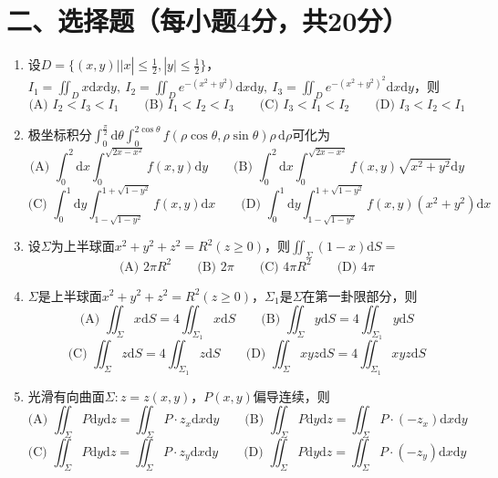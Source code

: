 \documentclass[12pt,a4paper]{ctexart}
\begin{document}
\section*{二、选择题（每小题4分，共20分）}
\begin{enumerate}
\item 设$D=\{(x,y)||x|\le \frac{1}{2},|y|\le\frac{1}{2}\}$，$I_{1}=\iint_{D} x \mathrm{d}x\mathrm{d}y,\ I_{2}=\iint_{D} e^{-(x^2+y^2)}\mathrm{d}x\mathrm{d}y,\ I_{3}=\iint_{D} e^{-(x^2+y^2)^2}\mathrm{d}x\mathrm{d}y$，则
\[
\text{(A) } I_{2}<I_{3}<I_{1}\qquad \text{(B) } I_{1}<I_{2}<I_{3}\qquad \text{(C) } I_{3}<I_{1}<I_{2}\qquad \text{(D) } I_{3}<I_{2}<I_{1}
\]

\item 极坐标积分$\int_{0}^{\frac{\pi}{2}} \mathrm{d}\theta \int_{0}^{2 \cos \theta} f(\rho \cos \theta,\rho \sin \theta)\rho \,\mathrm{d}\rho$可化为
\[
\text{(A) } \int_{0}^{2} \mathrm{d}x \int_{0}^{\sqrt{2x-x^{2}}} f(x,y)\mathrm{d}y\qquad 
\text{(B) } \int_{0}^{2} \mathrm{d}x \int_{0}^{\sqrt{2x-x^{2}}} f(x,y)\sqrt{x^2+y^2}\mathrm{d}y
\]
\[
\text{(C) } \int_{0}^{1} \mathrm{d}y \int_{1-\sqrt{1-y^{2}}}^{1+\sqrt{1-y^{2}}} f(x,y)\mathrm{d}x\qquad 
\text{(D) } \int_{0}^{1} \mathrm{d}y \int_{1-\sqrt{1-y^{2}}}^{1+\sqrt{1-y^{2}}} f(x,y)(x^2+y^2)\mathrm{d}x
\]

\item 设$\Sigma$为上半球面$x^{2}+y^{2}+z^{2}=R^{2}(z \ge 0)$，则$\iint_{\Sigma }(1-x)\mathrm{d}S=$
\[
\text{(A) } 2 \pi R^{2}\qquad \text{(B) } 2\pi\qquad \text{(C) } 4\pi R^2\qquad \text{(D) } 4\pi
\]

\item $\Sigma$是上半球面$x^{2}+y^{2}+z^{2}=R^{2}(z\ge0)$，$\Sigma_1$是$\Sigma$在第一卦限部分，则
\[
\text{(A) } \iint_{\Sigma} x\mathrm{d}S=4\iint_{\Sigma_1}x\mathrm{d}S\qquad 
\text{(B) } \iint_{\Sigma} y\mathrm{d}S=4\iint_{\Sigma_1}y\mathrm{d}S
\]
\[
\text{(C) } \iint_{\Sigma} z\mathrm{d}S=4\iint_{\Sigma_1}z\mathrm{d}S\qquad 
\text{(D) } \iint_{\Sigma} xyz\mathrm{d}S=4\iint_{\Sigma_1}xyz\mathrm{d}S
\]

\item 光滑有向曲面$\Sigma:z=z(x,y)$，$P(x,y)$偏导连续，则
\[
\text{(A) } \iint_{\Sigma} P\mathrm{d}y\mathrm{d}z=\iint_{\Sigma} P\cdot z_x \mathrm{d}x\mathrm{d}y\qquad 
\text{(B) } \iint_{\Sigma} P\mathrm{d}y\mathrm{d}z=\iint_{\Sigma} P\cdot (-z_x) \mathrm{d}x\mathrm{d}y
\]
\[
\text{(C) } \iint_{\Sigma} P\mathrm{d}y\mathrm{d}z=\iint_{\Sigma} P\cdot z_y \mathrm{d}x\mathrm{d}y\qquad 
\text{(D) } \iint_{\Sigma} P\mathrm{d}y\mathrm{d}z=\iint_{\Sigma} P\cdot (-z_y) \mathrm{d}x\mathrm{d}y
\]
\end{enumerate}
\end{document}
